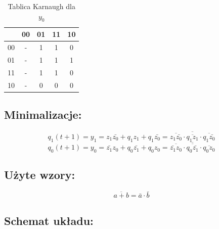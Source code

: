 \documentclass[12pt,a4paper]{article}
\begin{document}
\begin{table}[H]
\begin{minipage}{.5\textwidth}
				\caption{Tablica Karnaugh dla $y_0$}
				\vspace{0.2cm}
				\centering
				\begin{tabular}{c|c|c|c|c}
					\backslashbox{$z_1z_0$}{$q_1q_0$}&00&01&11&10\\\hline
					00	&	-	&	1	&	1	&	0	\\\hline
					01	&	-	&	1	&	1	&	1	\\\hline
					11	&	-	&	1	&	1	&	0	\\\hline
					10	&	-	&	0	&	0	&	0	
				\end{tabular}
			\end{minipage}
			\end{table}
		
		\subsection{Minimalizacje:}
			\begin{displaymath}
			q_1(t+1) = y_1 = z_1\bar{z_0} + q_1z_1 + q_1\bar{z_0}= \overline{\overline{z_1\bar{z_0}} \cdot \overline{q_1z_1} \cdot \overline{q_1\bar{z_0}}}
			\end{displaymath}
			\begin{displaymath}
			q_0(t+1) = y_0 = \bar{z_1}z_0 + q_0\bar{z_1} + q_0z_0= \overline{\overline{\bar{z_1}z_0} \cdot \overline{q_0\bar{z_1}} \cdot \overline{q_0z_0}}
			\end{displaymath}
		
		\subsection{Użyte wzory:}
			\begin{equation}
			\overline{a+b}=\bar{a}\cdot\bar{b}
			\end{equation}
		
		\subsection{Schemat układu:}
		
\end{document}
